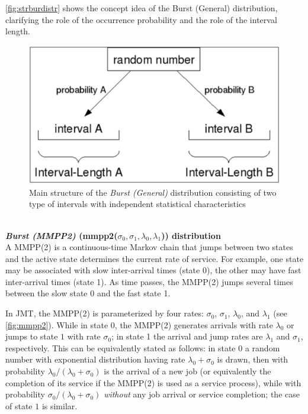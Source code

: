 \autoref{fig:strburdistr} shows the concept idea of the Burst
(General) distribution, clarifying the role of the occurrence
probability and the role of the interval length.
\begin{figure}[htb]
    \begin{center}
        \includegraphics[scale=.5]{img/jsimg/4.1.eps}
    \end{center}
    \caption{Main structure of the \emph{Burst (General)} distribution consisting
    of two type of intervals with independent statistical characteristics}
    \label{fig:strburdistr}
\end{figure}\\

\textbf{\emph{Burst (MMPP2)} (mmpp2($\sigma_0,\sigma_1,\lambda_0,\lambda_1$)) distribution}\\
A MMPP(2) is a continuous-time Markov chain that jumps between two
states and the active state determines the current rate of service. For example, one state may be
associated with slow inter-arrival times (state 0), the other may have fast
inter-arrival times (state 1). As time passes, the MMPP(2) jumps several times between the slow state 0 and
the fast state 1.

In JMT, the MMPP(2) is parameterized by four rates: $\sigma_0$,  $\sigma_1$,
$\lambda_0$, and $\lambda_1$ (see \autoref{fig:mmpp2}). While in state $0$, the MMPP(2) generates
arrivals with rate $\lambda_0$ or jumps to state $1$ with rate $\sigma_0$; in state 1 the arrival
and jump rates are $\lambda_1$ and $\sigma_1$, respectively. This can be equivalently stated as follows: in state $0$ a random number with exponential distribution having rate $\lambda_0+\sigma_0$ is drawn, then with probability $\lambda_0/(\lambda_0+\sigma_0)$ is the arrival of a new job (or equivalently the completion of its service if the MMPP(2) is used as a service process), while with probability $\sigma_0/(\lambda_0+\sigma_0)$ \emph{without} any job arrival or service completion; the case of state $1$ is similar.

